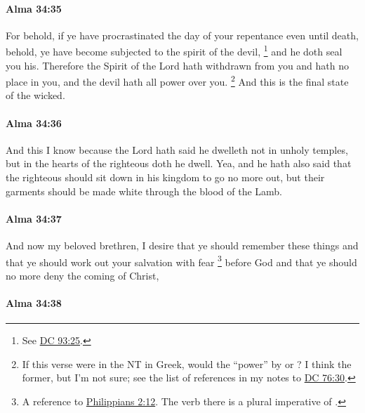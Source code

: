		\paragraph{Alma 34:35} %
			\label{ALMA-34-35}
			
			For behold, if ye have procrastinated the day of your repentance even until death,
			behold, ye have become subjected to the spirit of the devil,%
				\footnote{%
					See \hyperref[DC93-25]{DC 93:25}.
					}
			and he doth seal you his.
			Therefore the Spirit of the Lord hath withdrawn from you and hath no place in you,
			and the devil hath all power over you.%
				\footnote{%
					If this verse were in the NT in Greek, would the ``power'' by  or ? I think the former, but I'm not sure; see the list of references in my notes to \hyperref[DC76-30]{DC 76:30}.
					}
			And this is the final state of the wicked.
			
		\paragraph{Alma 34:36} %
			\label{ALMA-34-36}
			
			And this I know because the Lord hath said
			he dwelleth not in unholy temples,
			but in the hearts of the righteous doth he dwell.
			Yea, and he hath also said
			that the righteous should sit down in his kingdom to go no more out,
			but their garments should be made white through the blood of the Lamb.

		\paragraph{Alma 34:37} %
			\label{ALMA-34-37}

			And now my beloved brethren, I desire that ye should remember these things
			and that ye should work out your salvation with fear%
			\footnote{%
				A reference to \hyperref[PHILIPPIANS-2-12]{Philippians 2:12}. The verb there is a plural imperative of .
				}
			before God
			and that ye should no more deny the coming of Christ,

		\paragraph{Alma 34:38} %
			\label{ALMA-34-38}

